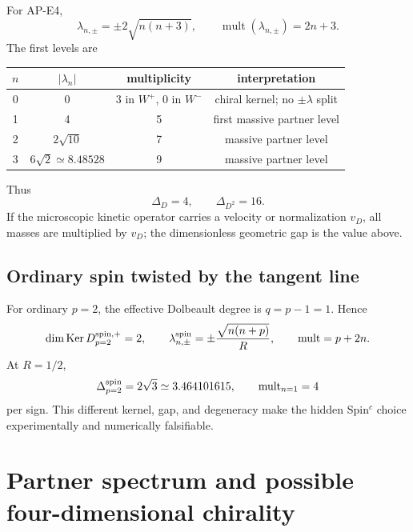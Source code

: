 \documentclass[11pt]{article}
\theoremstyle{definition}
\theoremstyle{remark}
\newcommand{\Ker}{\operatorname{Ker}}
\begin{document}
For AP-E4,
\begin{equation}
 \lambda_{n,\pm}=\pm2\sqrt{n(n+3)},
 \qquad \operatorname{mult}(\lambda_{n,\pm})=2n+3.
 \label{eq:tangent-spectrum}
\end{equation}
The first levels are
\begin{center}
\begin{tabular}{@{}cccc@{}}
\toprule
\(n\) & \(|\lambda_n|\) & multiplicity & interpretation\\
\midrule
0 & 0 & \(3\) in \(W^+\), \(0\) in \(W^-\) & chiral kernel; no
\(\pm\lambda\) split\\
1 & 4 & 5 & first massive partner level\\
2 & \(2\sqrt{10}\) & 7 & massive partner level\\
3 & \(6\sqrt2\simeq8.48528\) & 9 & massive partner level\\
\bottomrule
\end{tabular}
\end{center}
Thus
\begin{equation}
 \boxed{\Delta_D=4,\qquad \Delta_{D^2}=16.}
 \label{eq:canonical-gap}
\end{equation}
If the microscopic kinetic operator carries a velocity or normalization
\(v_D\), all masses are multiplied by \(v_D\); the dimensionless geometric
gap is the value above.

\subsection{Ordinary spin twisted by the tangent line}

For ordinary \(p=2\), the effective Dolbeault degree is \(q=p-1=1\).  Hence
\begin{equation}
 \dim\Ker D_{p=2}^{\rm spin,+}=2,\qquad
 \lambda_{n,\pm}^{\rm spin}
 =\pm\frac{\sqrt{n(n+p)}}{R},\qquad
 \operatorname{mult}=p+2n.
 \label{eq:ordinary-spectrum}
\end{equation}
At \(R=1/2\),
\begin{equation}
 \Delta_{p=2}^{\rm spin}=2\sqrt3\simeq3.464101615,
 \qquad \operatorname{mult}_{n=1}=4
 \label{eq:ordinary-gap}
\end{equation}
per sign.  This different kernel, gap, and degeneracy make the hidden
Spin\({}^c\) choice experimentally and numerically falsifiable.

\section{Partner spectrum and possible four-dimensional chirality}
\end{document}
